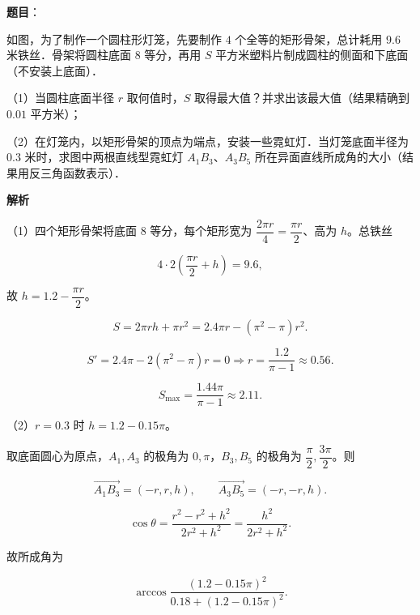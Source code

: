 \begin{answer}

\textbf{题目}：

如图，为了制作一个圆柱形灯笼，先要制作 $4$ 个全等的矩形骨架，总计耗用 $9.6$ 米铁丝．骨架将圆柱底面 $8$ 等分，再用 $S$ 平方米塑料片制成圆柱的侧面和下底面（不安装上底面）．

（1）当圆柱底面半径 $r$ 取何值时，$S$ 取得最大值？并求出该最大值（结果精确到 $0.01$ 平方米）；

（2）在灯笼内，以矩形骨架的顶点为端点，安装一些霓虹灯．当灯笼底面半径为 $0.3$ 米时，求图中两根直线型霓虹灯 $A_1B_3$、$A_3B_5$ 所在异面直线所成角的大小（结果用反三角函数表示）．
\nopagebreak[4]
\begin{center}\end{center}
\nopagebreak[4]
\textbf{解析}

（1）四个矩形骨架将底面 $8$ 等分，每个矩形宽为 $\dfrac{2\pi r}{4}=\dfrac{\pi r}2$、高为 $h$。总铁丝

\nopagebreak[4]
\[4\cdot2\left(\frac{\pi r}2+h\right)=9.6,\]

故 $h=1.2-\dfrac{\pi r}2$。

\nopagebreak[4]
\[S=2\pi rh+\pi r^2
=2.4\pi r-(\pi^2-\pi)r^2.\]

\nopagebreak[4]
\[S'=2.4\pi-2(\pi^2-\pi)r=0
\Longrightarrow r=\frac{1.2}{\pi-1}\approx0.56.\]

\nopagebreak[4]
\[S_{\max}=\frac{1.44\pi}{\pi-1}\approx2.11.\]

（2）$r=0.3$ 时 $h=1.2-0.15\pi$。

取底面圆心为原点，$A_1,A_3$ 的极角为 $0,\pi$，$B_3,B_5$ 的极角为 $\dfrac\pi2,\dfrac{3\pi}2$。则

\nopagebreak[4]
\[\overrightarrow{A_1B_3}=(-r,r,h),\qquad
\overrightarrow{A_3B_5}=(-r,-r,h).\]

\nopagebreak[4]
\[\cos\theta=\frac{r^2-r^2+h^2}{2r^2+h^2}
=\frac{h^2}{2r^2+h^2}.\]

故所成角为

\nopagebreak[4]
\[\arccos\frac{(1.2-0.15\pi)^2}{0.18+(1.2-0.15\pi)^2}.\]


\end{answer}
